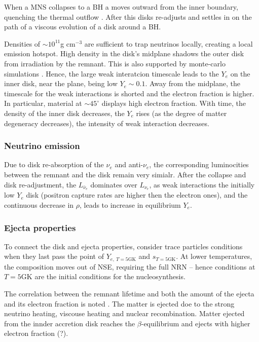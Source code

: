 When a \ac{MNS} collapses to a \ac{BH} a  moves outward from the inner boundary, quenching the thermal outflow \citep{Metzger:2014ila}. After this disks re-adjusts and settles in on the path of a viscous evolution of a disk around a BH. 

Densities of $\sim 10^11$g cm$^{-3}$ are sufficient to trap neutrinos locally, creating a local emission hotspot. 
High density in the disk's midplane shadows the outer disk from irradiation by the remnant. This is also supported by monte-carlo simulations \citep{Richers:2015lma}. Hence, the large weak interatcion timescale leads to the $Y_e$ on the inner disk, near the plane, being low $Y_e\sim0.1$. Away from the midplane, the timescale for the weak interactions is shorted and the electron fraction is higher. In particular, material at $\sim45^{\circ}$ displays high electron fraction.
With time, the density of the inner disk decreases, the $Y_e$ rises (as the degree of matter degeneracy decreases), the intensity of weak interaction decreases. 


\subsubsection{Neutrino emission}

Due to disk re-absorption of the $\nu_e$ and anti-$\nu_e$, the corresponding luminocities between the remnant and the disk remain very simialr. 
After the collapse and disk re-adjustment, the $L_{\bar{\nu}_e}$ dominates over $L_{\nu_e}$, as weak interactions  the initially low $Y_e$ disk (positron capture rates are higher then the electron ones), and the continuous decrease in $\rho$, leads to increase in equilibrium $Y_e$.


\subsubsection{Ejecta properties}

To connect the disk and ejecta properties, consider trace particles conditions when they last pass the point of $Y_{e,\:T=5\text{GK}}$ and $s_{T=5\text{GK}}$. At lower temperatures, the composition moves out of \ac{NSE}, requiring the full \ac{NRN} -- hence conditions at $T=5$GK are the initial conditions for the nucleosynthesis.

The correlation between the remnant lifetime and both the amount of the ejecta and its electron fraction is noted \citep{Metzger:2014ila}. The matter is ejected doe to the strong neutrino heating, viscouse heating and nuclear recombination. Matter ejected from the innder accretion disk reaches the $\beta$-equilibrium and ejects with higher electron fraction (?). 

